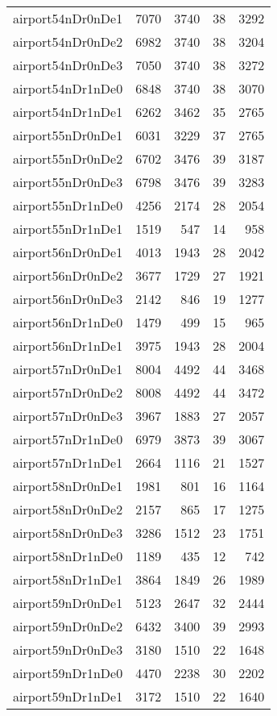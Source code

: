 \begin{longtable}{lrrrr}
airport54nDr0nDe1 & 7070 & 3740 & 38 & 3292 \\
airport54nDr0nDe2 & 6982 & 3740 & 38 & 3204 \\
airport54nDr0nDe3 & 7050 & 3740 & 38 & 3272 \\
airport54nDr1nDe0 & 6848 & 3740 & 38 & 3070 \\
airport54nDr1nDe1 & 6262 & 3462 & 35 & 2765 \\
airport55nDr0nDe1 & 6031 & 3229 & 37 & 2765 \\
airport55nDr0nDe2 & 6702 & 3476 & 39 & 3187 \\
airport55nDr0nDe3 & 6798 & 3476 & 39 & 3283 \\
airport55nDr1nDe0 & 4256 & 2174 & 28 & 2054 \\
airport55nDr1nDe1 & 1519 & 547 & 14 & 958 \\
airport56nDr0nDe1 & 4013 & 1943 & 28 & 2042 \\
airport56nDr0nDe2 & 3677 & 1729 & 27 & 1921 \\
airport56nDr0nDe3 & 2142 & 846 & 19 & 1277 \\
airport56nDr1nDe0 & 1479 & 499 & 15 & 965 \\
airport56nDr1nDe1 & 3975 & 1943 & 28 & 2004 \\
airport57nDr0nDe1 & 8004 & 4492 & 44 & 3468 \\
airport57nDr0nDe2 & 8008 & 4492 & 44 & 3472 \\
airport57nDr0nDe3 & 3967 & 1883 & 27 & 2057 \\
airport57nDr1nDe0 & 6979 & 3873 & 39 & 3067 \\
airport57nDr1nDe1 & 2664 & 1116 & 21 & 1527 \\
airport58nDr0nDe1 & 1981 & 801 & 16 & 1164 \\
airport58nDr0nDe2 & 2157 & 865 & 17 & 1275 \\
airport58nDr0nDe3 & 3286 & 1512 & 23 & 1751 \\
airport58nDr1nDe0 & 1189 & 435 & 12 & 742 \\
airport58nDr1nDe1 & 3864 & 1849 & 26 & 1989 \\
airport59nDr0nDe1 & 5123 & 2647 & 32 & 2444 \\
airport59nDr0nDe2 & 6432 & 3400 & 39 & 2993 \\
airport59nDr0nDe3 & 3180 & 1510 & 22 & 1648 \\
airport59nDr1nDe0 & 4470 & 2238 & 30 & 2202 \\
airport59nDr1nDe1 & 3172 & 1510 & 22 & 1640 \\

\end{longtable}
